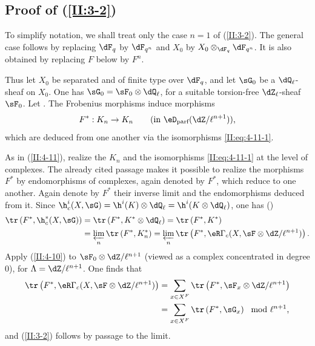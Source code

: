 \subsection{Proof of \texorpdfstring{(\ref{II:3-2})}{(3.2)}}\label{II:4-13}

To simplify notation, we shall treat only the case $n=1$ of
(\ref{II:3-2}). The general case follows by replacing $\dF_q$ by $\dF_{q^n}$ and $X_0$ by $X_0\otimes_{\dF_q}\dF_{q^n}$. It is also obtained by replacing $F$ below by $F^n$.

Thus let $X_0$ be separated and of finite type over $\dF_q$, and let $\sG_0$
be a $\dQ_\ell$-sheaf on $X_0$. One has
$\sG_0=\sF_0\otimes\dQ_\ell$, for a suitable torsion-free
$\dZ_\ell$-sheaf $\sF_0$. Let
. The Frobenius morphisms induce
morphisms
\[
  F^* : K_n\to K_n \qquad \text{(in $\eD_\text{parf}(\dZ/\ell^{n+1})$),}
\]
which are deduced from one another via the isomorphisms
\eqref{II:eq:4-11-1}.

As in (\ref{II:4-11}), realize the $K_n$ and the isomorphisms
\eqref{II:eq:4-11-1} at the level of complexes. The already cited passage
 makes it possible to realize the morphisms $F^*$ by
endomorphisms of complexes, again denoted by $F^*$, which reduce to one
another. Again denote by $F^*$ their inverse limit and the endomorphisms
deduced from it. Since
$\h_c^i(X,\sG) = \h^i(K)\otimes\dQ_\ell = \h^i(K\otimes\dQ_\ell)$, one has
()
\begin{align*}
  \tr\left(F^*, \h_c^*(X,\sG)\right) &= \tr\left(F^*,K^*\otimes\dQ_\ell\right) = \tr\left(F^*,K^*\right) \\
  &= \varprojlim_n \tr\left(F^*,K_n^*\right) = \varprojlim_n \tr\left(F^*,\eR\Gamma_c(X,\sF\otimes\dZ/\ell^{n+1})\right) \text{.}
\end{align*}
Apply (\ref{II:4-10}) to $\sF_0\otimes\dZ/\ell^{n+1}$ (viewed as a complex
concentrated in degree $0$), for $\Lambda=\dZ/\ell^{n+1}$. One finds that
\begin{align*}
  \tr\left(F^*,\eR\Gamma_c(X,\sF\otimes\dZ/\ell^{n+1})\right)
    &= \sum_{x\in X^F} \tr\left(F^*,\sF_x\otimes\dZ/\ell^{n+1}\right) \\
    &= \sum_{x\in X^F} \tr\left(F^*,\sG_x\right) \mod \ell^{n+1} \text{,}
\end{align*}
and (\ref{II:3-2}) follows by passage to the limit.











